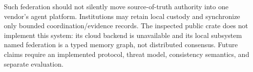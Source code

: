 Such federation should not silently move source-of-truth authority into one vendor's agent platform. Institutions may retain local custody and synchronize only bounded coordination/evidence records. The inspected public crate does not implement this system: its cloud backend is unavailable and its local subsystem named federation is a typed memory graph, not distributed consensus. Future claims require an implemented protocol, threat model, consistency semantics, and separate evaluation.
